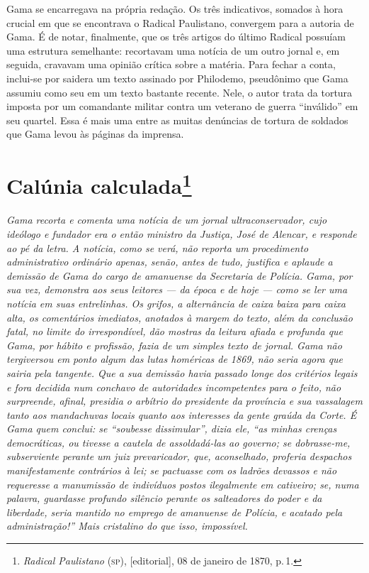 \begin{argumento}
Gama se encarregava na própria redação. Os três indicativos, somados à
hora crucial em que se encontrava o \textnormal{Radical Paulistano}, convergem
para a autoria de Gama. É de notar, finalmente, que os três artigos do
último Radical possuíam uma estrutura semelhante: recortavam uma notícia
de um outro jornal e, em seguida, cravavam uma opinião crítica sobre a
matéria. Para fechar a conta, inclui-se por saidera um texto assinado
por Philodemo, pseudônimo que Gama assumiu como seu em um texto bastante
recente. Nele, o autor trata da tortura imposta por um comandante
militar contra um veterano de guerra ``inválido'' em seu quartel. Essa é
mais uma entre as muitas denúncias de tortura de soldados que Gama levou
às páginas da imprensa.
\end{argumento}


\chapter{Calúnia calculada\footnote{\emph{Radical Paulistano} (\textsc{sp}), {[}editorial{]}, 08 de janeiro de 1870, p.\,1.}} %

\begin{didascalia}

\emph{Gama recorta e comenta uma notícia de um jornal ultraconservador,
cujo ideólogo e fundador era o então ministro da Justiça, José de
Alencar, e responde ao pé da letra. A notícia, como se verá, não reporta
um procedimento administrativo ordinário apenas, senão, antes de tudo,
justifica e aplaude a demissão de Gama do cargo de amanuense da
Secretaria de Polícia. Gama, por sua vez, demonstra aos seus leitores ---
da época e de hoje --- como se ler uma notícia em suas entrelinhas. Os
grifos, a alternância de caixa baixa para caixa alta, os comentários
imediatos, anotados à margem do texto, além da conclusão fatal, no
limite do irrespondível, dão mostras da leitura afiada e profunda que
Gama, por hábito e profissão, fazia de um simples texto de jornal. Gama
não tergiversou em ponto algum das lutas homéricas de 1869, não seria
agora que sairia pela tangente. Que a sua demissão havia passado longe
dos critérios legais e fora decidida num conchavo de autoridades
incompetentes para o feito, não surpreende, afinal, presidia o arbítrio
do presidente da província e sua vassalagem tanto aos mandachuvas locais
quanto aos interesses da gente graúda da Corte. É Gama quem conclui: se
``soubesse dissimular'', dizia ele, ``as minhas crenças democráticas, ou
tivesse a cautela de assoldadá-las ao governo; se dobrasse-me,
subserviente perante um juiz prevaricador, que, aconselhado, proferia
despachos manifestamente contrários à lei; se pactuasse com os ladrões
devassos e não requeresse a manumissão de indivíduos postos ilegalmente
em cativeiro; se, numa palavra, guardasse profundo silêncio perante os
salteadores do poder e da liberdade, seria mantido no emprego de
amanuense de Polícia, e acatado pela administração!'' Mais cristalino do
que isso, impossível.}
\end{didascalia}



